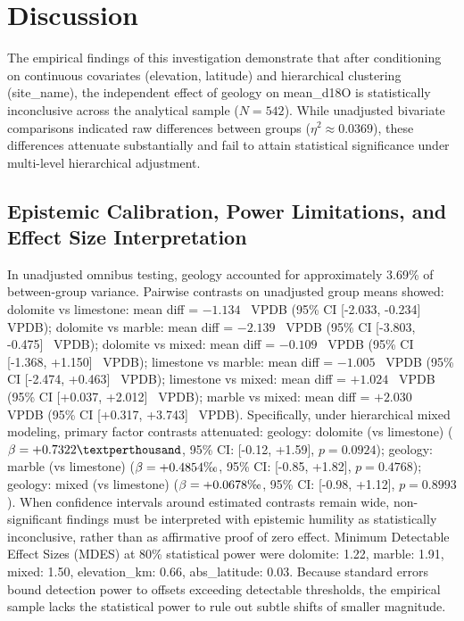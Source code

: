 \documentclass[sn-basic,Numbered]{sn-jnl}%
\begin{document}
\section{Discussion}
\label{sec:discussion}
The empirical findings of this investigation demonstrate that after conditioning on continuous covariates (elevation, latitude) and hierarchical clustering (site\_name), the independent effect of geology on mean\_d18O is statistically inconclusive across the analytical sample ($N = 542$). While unadjusted bivariate comparisons indicated raw differences between groups ($\eta^2 \approx 0.0369$), these differences attenuate substantially and fail to attain statistical significance under multi-level hierarchical adjustment.

\subsection{Epistemic Calibration, Power Limitations, and Effect Size Interpretation}
In unadjusted omnibus testing, geology accounted for approximately 3.69\% of between-group variance. Pairwise contrasts on unadjusted group means showed: dolomite vs limestone: mean diff = $-1.134$~\text{\textperthousand} VPDB (95\% CI [-2.033, -0.234]~\textperthousand{} VPDB); dolomite vs marble: mean diff = $-2.139$~\text{\textperthousand} VPDB (95\% CI [-3.803, -0.475]~\textperthousand{} VPDB); dolomite vs mixed: mean diff = $-0.109$~\text{\textperthousand} VPDB (95\% CI [-1.368, +1.150]~\textperthousand{} VPDB); limestone vs marble: mean diff = $-1.005$~\text{\textperthousand} VPDB (95\% CI [-2.474, +0.463]~\textperthousand{} VPDB); limestone vs mixed: mean diff = $+1.024$~\text{\textperthousand} VPDB (95\% CI [+0.037, +2.012]~\textperthousand{} VPDB); marble vs mixed: mean diff = $+2.030$~\text{\textperthousand} VPDB (95\% CI [+0.317, +3.743]~\textperthousand{} VPDB). Specifically, under hierarchical mixed modeling, primary factor contrasts attenuated: geology: dolomite (vs limestone) ($\beta = +0.7322\textperthousand$, 95\% CI: [-0.12, +1.59], $p = 0.0924$); geology: marble (vs limestone) ($\beta = +0.4854\text{\textperthousand}$, 95\% CI: [-0.85, +1.82], $p = 0.4768$); geology: mixed (vs limestone) ($\beta = +0.0678\text{\textperthousand}$, 95\% CI: [-0.98, +1.12], $p = 0.8993$). When confidence intervals around estimated contrasts remain wide, non-significant findings must be interpreted with epistemic humility as statistically inconclusive, rather than as affirmative proof of zero effect. Minimum Detectable Effect Sizes (MDES) at 80\% statistical power were dolomite: 1.22\text{\textperthousand}, marble: 1.91\textperthousand, mixed: 1.50\textperthousand, elevation\_km: 0.66\textperthousand, abs\_latitude: 0.03\textperthousand. Because standard errors bound detection power to offsets exceeding detectable thresholds, the empirical sample lacks the statistical power to rule out subtle shifts of smaller magnitude.
\end{document}
